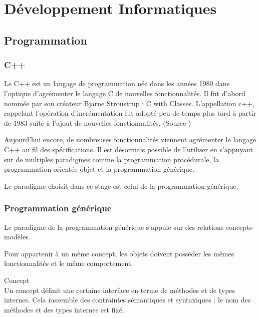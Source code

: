 \section{Développement Informatiques}

\subsection{Programmation}

\subsubsection{C++}


Le C++ est un langage de programmation née dans les années 1980 dans l'optique d'agrémenter le langage C de nouvelles fonctionnalités. Il fut d'abord nommée par son créateur Bjarne Stroustrup : C with Classes. L’appellation c++, rappelant l'opération d'incrémentation fut adopté peu de temps plus tard à partir de 1983 suite à l'ajout de nouvelles fonctionnalités. (Source \cite{Wiki-cpp})

Aujourd'hui encore, de nombreuses fonctionnalités viennent agrémenter le langage C++ au fil des spécifications. Il est désormais possible de l'utiliser en s'appuyant sur de multiples paradigmes comme la programmation procédurale, la programmation orientée objet et la programmation générique.

Le paradigme choisit dans ce stage est celui de la programmation générique. \cite{troussil-cpp}

\subsubsection{Programmation générique}


Le paradigme de la programmation générique s'appuie sur des relations concepts-modèles. 

Pour appartenir à un même concept, les objets doivent posséder les mêmes fonctionnalités et le même comportement. 

\begin{Definition}{Concept}\\
\label{def:cpp-con}
    Un concept définit une certaine interface en terme de méthodes et de types internes. Cela rassemble des contraintes sémantiques et syntaxiques : le nom des méthodes et des types internes est fixé.
\end{Definition}

